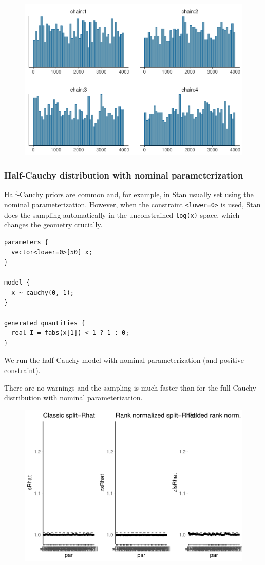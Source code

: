\documentclass[american,]{article}
\begin{document}
\begin{figure}[tp]
  \centering
  \includegraphics[width=0.6\linewidth]{graphics/hist-fit-alt3-lp-1.pdf}
\end{figure}

\hypertarget{half-cauchy-distribution-with-nominal-parameterization}{%
\subsubsection*{Half-Cauchy distribution with nominal
parameterization}\label{half-cauchy-distribution-with-nominal-parameterization}}

Half-Cauchy priors are common and, for example, in Stan usually set
using the nominal parameterization. However, when the constraint
\texttt{\textless{}lower=0\textgreater{}} is used, Stan does the
sampling automatically in the unconstrained \texttt{log(x)} space, which
changes the geometry crucially.

\begin{verbatim}
parameters {
  vector<lower=0>[50] x;
}

model {
  x ~ cauchy(0, 1);
}

generated quantities {
  real I = fabs(x[1]) < 1 ? 1 : 0;
}
\end{verbatim}

We run the half-Cauchy model with nominal parameterization (and positive
constraint).

There are no warnings and the sampling is much faster than for the full
Cauchy distribution with nominal parameterization.

\begin{figure}[tp]
  \centering
  \includegraphics[width=0.6\linewidth]{graphics/rhat-fit-half-nom-1.pdf}
\end{figure}
\end{document}
